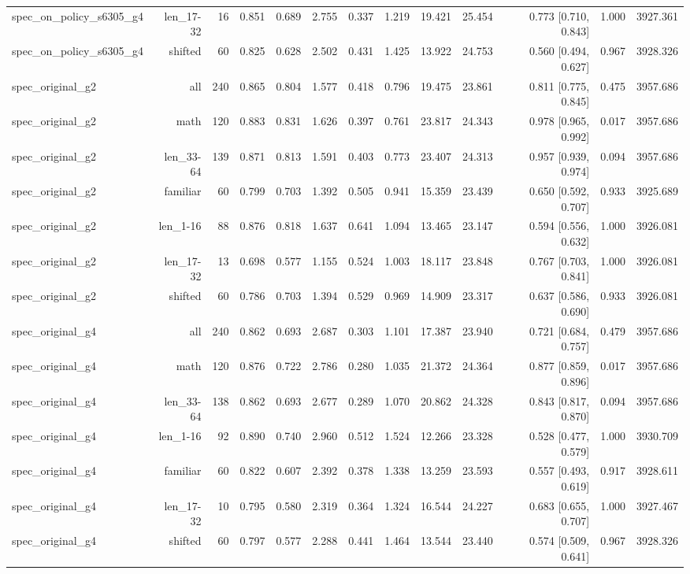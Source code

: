 \begin{tabular}{lrrrrrrrrrrrr}
spec\_on\_policy\_s6305\_g4 & len\_17-32 & 16 & 0.851 & 0.689 & 2.755 & 0.337 & 1.219 & 19.421 & 25.454 & 0.773 [0.710, 0.843] & 1.000 & 3927.361 \\
spec\_on\_policy\_s6305\_g4 & shifted & 60 & 0.825 & 0.628 & 2.502 & 0.431 & 1.425 & 13.922 & 24.753 & 0.560 [0.494, 0.627] & 0.967 & 3928.326 \\
spec\_original\_g2 & all & 240 & 0.865 & 0.804 & 1.577 & 0.418 & 0.796 & 19.475 & 23.861 & 0.811 [0.775, 0.845] & 0.475 & 3957.686 \\
spec\_original\_g2 & math & 120 & 0.883 & 0.831 & 1.626 & 0.397 & 0.761 & 23.817 & 24.343 & 0.978 [0.965, 0.992] & 0.017 & 3957.686 \\
spec\_original\_g2 & len\_33-64 & 139 & 0.871 & 0.813 & 1.591 & 0.403 & 0.773 & 23.407 & 24.313 & 0.957 [0.939, 0.974] & 0.094 & 3957.686 \\
spec\_original\_g2 & familiar & 60 & 0.799 & 0.703 & 1.392 & 0.505 & 0.941 & 15.359 & 23.439 & 0.650 [0.592, 0.707] & 0.933 & 3925.689 \\
spec\_original\_g2 & len\_1-16 & 88 & 0.876 & 0.818 & 1.637 & 0.641 & 1.094 & 13.465 & 23.147 & 0.594 [0.556, 0.632] & 1.000 & 3926.081 \\
spec\_original\_g2 & len\_17-32 & 13 & 0.698 & 0.577 & 1.155 & 0.524 & 1.003 & 18.117 & 23.848 & 0.767 [0.703, 0.841] & 1.000 & 3926.081 \\
spec\_original\_g2 & shifted & 60 & 0.786 & 0.703 & 1.394 & 0.529 & 0.969 & 14.909 & 23.317 & 0.637 [0.586, 0.690] & 0.933 & 3926.081 \\
spec\_original\_g4 & all & 240 & 0.862 & 0.693 & 2.687 & 0.303 & 1.101 & 17.387 & 23.940 & 0.721 [0.684, 0.757] & 0.479 & 3957.686 \\
spec\_original\_g4 & math & 120 & 0.876 & 0.722 & 2.786 & 0.280 & 1.035 & 21.372 & 24.364 & 0.877 [0.859, 0.896] & 0.017 & 3957.686 \\
spec\_original\_g4 & len\_33-64 & 138 & 0.862 & 0.693 & 2.677 & 0.289 & 1.070 & 20.862 & 24.328 & 0.843 [0.817, 0.870] & 0.094 & 3957.686 \\
spec\_original\_g4 & len\_1-16 & 92 & 0.890 & 0.740 & 2.960 & 0.512 & 1.524 & 12.266 & 23.328 & 0.528 [0.477, 0.579] & 1.000 & 3930.709 \\
spec\_original\_g4 & familiar & 60 & 0.822 & 0.607 & 2.392 & 0.378 & 1.338 & 13.259 & 23.593 & 0.557 [0.493, 0.619] & 0.917 & 3928.611 \\
spec\_original\_g4 & len\_17-32 & 10 & 0.795 & 0.580 & 2.319 & 0.364 & 1.324 & 16.544 & 24.227 & 0.683 [0.655, 0.707] & 1.000 & 3927.467 \\
spec\_original\_g4 & shifted & 60 & 0.797 & 0.577 & 2.288 & 0.441 & 1.464 & 13.544 & 23.440 & 0.574 [0.509, 0.641] & 0.967 & 3928.326 \\
\bottomrule
\end{tabular}
